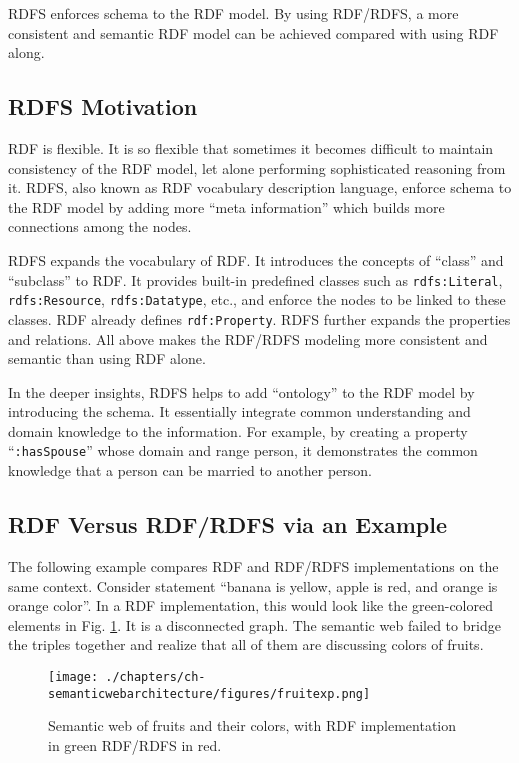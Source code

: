 RDFS enforces schema to the RDF model. By using RDF/RDFS, a more consistent and semantic RDF model can be achieved compared with using RDF along.

\subsection{RDFS Motivation}

RDF is flexible. It is so flexible that sometimes it becomes difficult to maintain consistency of the RDF model, let alone performing sophisticated reasoning from it. RDFS, also known as RDF vocabulary description language, enforce schema to the RDF model by adding more ``meta information'' which builds more connections among the nodes.

RDFS expands the vocabulary of RDF. It introduces the concepts of ``class'' and ``subclass'' to RDF. It provides built-in predefined classes such as \verb|rdfs:Literal|, \verb|rdfs:Resource|, \verb|rdfs:Datatype|, etc., and enforce the nodes to be linked to these classes. RDF already defines \verb|rdf:Property|. RDFS further expands the properties and relations. All above makes the RDF/RDFS modeling more consistent and semantic than using RDF alone.

In the deeper insights, RDFS helps to add ``ontology'' to the RDF model by introducing the schema. It essentially integrate common understanding and domain knowledge to the information. For example, by creating a property ``\verb|:hasSpouse|'' whose domain and range person, it demonstrates the common knowledge that a person can be married to another person.

\subsection{RDF Versus RDF/RDFS via an Example} \label{subsec:rdfvsrdfs}

The following example compares RDF and RDF/RDFS implementations on the same context. Consider statement ``banana is yellow, apple is red, and orange is orange color''. In a RDF implementation, this would look like the green-colored elements in Fig. \ref{fig:fruitexp}. It is a disconnected graph. The semantic web failed to bridge the triples together and realize that all of them are discussing colors of fruits.
\begin{figure}[htbp]
	\centering
	\texttt{[image: ./chapters/ch-semanticwebarchitecture/figures/fruitexp.png]}
	\caption{Semantic web of fruits and their colors, with RDF implementation in green RDF/RDFS in red.}
	\label{fig:fruitexp}
\end{figure}

